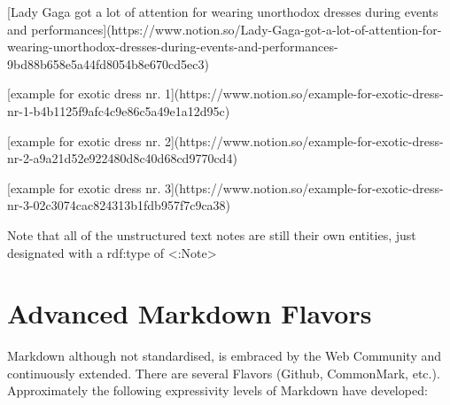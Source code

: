 [Lady Gaga got a lot of attention for wearing unorthodox dresses during events and performances](https://www.notion.so/Lady-Gaga-got-a-lot-of-attention-for-wearing-unorthodox-dresses-during-events-and-performances-9bd88b658e5a44fd8054b8e670cd5ec3) 

[example for exotic dress nr. 1](https://www.notion.so/example-for-exotic-dress-nr-1-b4b1125f9afc4c9e86c5a49e1a12d95c) 

[example for exotic dress nr. 2](https://www.notion.so/example-for-exotic-dress-nr-2-a9a21d52e922480d8c40d68cd9770cd4) 

[example for exotic dress nr. 3](https://www.notion.so/example-for-exotic-dress-nr-3-02c3074cac824313b1fdb957f7c9ca38) 

Note that all of the unstructured text notes are still their own entities, just designated with a rdf:type of <:Note>
\section{Advanced Markdown Flavors}
Markdown although not standardised, is embraced by the Web Community and continuously extended. There are several Flavors (Github, CommonMark, etc.). Approximately the following expressivity levels of Markdown have developed:

